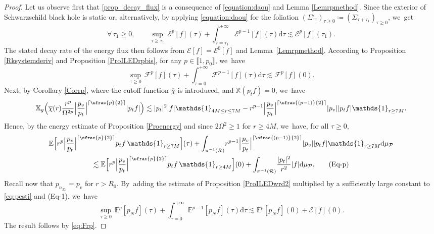 \documentclass[JEP,XML,SOM,Unicode,published]{cedram}
\newcommand{\psfrac}[2]{\sfrac{(#1)}{#2}}
\theoremstyle{plain}
\theoremstyle{definition}
\newcommand\T{{\mathbb{X}}}
\newcommand\dr{{\mathrm{d}}}
\begin{document}
\begin{proof}
Let us observe first that \eqref{prop_decay_flux} is a consequence of \eqref{equation:daou} and Lemma \ref{Lemrpmethod}. Since the exterior of Schwarzschild black hole is static or, alternatively, by applying \eqref{equation:daou} for the foliation $(\Sigma'_\tau)_{\tau \geq 0}\coloneqq(\Sigma_{\tau+\tau_1})_{\tau \geq 0}$, we~get\vspace*{-3pt}
\[
\forall \, \tau_1 \geq 0, \qquad \sup_{\tau \geq \tau_1} \, \mathcal{E}^p[f](\tau) + \int_{\tau=\tau_1}^{+\infty} \mathcal{E}^{p-1}[f](\tau) \dr \tau \lesssim \mathcal{E}^p[f](\tau_1).
\]
The stated decay rate of the energy flux then follows from $\mathcal{E}[f]=\mathcal{E}^0[f]$ and Lem\-ma~\ref{Lemrpmethod}.
According to Proposition \ref{Rksystemderiv} and Proposition \ref{ProILEDrpbis}, for any $p \in \llbracket 1,p_0 \rrbracket$, we~have\vspace*{-3pt}
\begin{equation}\label{eq:Frp}
\sup_{\tau \geq 0}\, \mathcal{F}^p[f](\tau) + \int_{\tau =0}^{+\infty} \mathcal{F}^{p-1}[f](\tau) \dr \tau \lesssim \mathcal{F}^p[f](0).
\end{equation}
Next, by Corollary \ref{Corrp}, where the cutoff function $\overline{\chi}$ is introduced, and $\T(p_t f)=0$, we~have\vspace*{-4pt}
\[
\T_g \Bigl(\overline{\chi}(r) \frac{r^{p}}{\Omega^{2p}} \Big|\frac{p_v}{p_t}\Big|^{\lceil \sfrac{p}{2} \rceil} | p_t f | \Bigr) \lesssim |p_t|^2| f| \mathds{1}_{4M \leq r \leq 7M}- r^{p-1} \Big|\frac{p_v}{p_t}\Big|^{\lceil \psfrac{p-1}{2} \rceil}|p_v||p_t f| \mathds{1}_{r \geq 7M}.
\]
Hence, by the energy estimate of Proposition \ref{Proenergy} and since $2\Omega^2 \geq 1$ for $ r \geq 4M$, we~have, for all $\tau \geq 0$,\vspace*{-4pt}
\begin{multline}
\mathbb{E} \Bigl[ r^{p} \Big|\frac{p_v}{p_t}\Big|^{\lceil \sfrac{p}{2} \rceil} p_t f \, \mathds{1}_{r \geq 7M} \Bigr] (\tau)+\int_{\pi^{-1}(\mathcal{R})} \! r^{p-1} \Big|\frac{p_v}{p_t}\Big|^{\lceil \psfrac{p-1}{2} \rceil}|p_v||p_t f| \mathds{1}_{r \geq 7M} \dr \mu_{\mathcal{P}} \\
\lesssim \mathbb{E} \Bigl[ r^{p} \Big|\frac{p_v}{p_t}\Big|^{\lceil \sfrac{p}{2} \rceil} p_t f \, \mathds{1}_{r \geq 4M} \Bigr] (0)+\int_{\pi^{-1}(\mathcal{R})} \! \frac{ |p_t|^2}{r^2} |f| \dr \mu_{\mathcal{P}}. \label{eq:pesti} \tag{Eq-p}
\end{multline}
Recall now that $p_{n_{\Sigma_\tau}} = p_v$ for $r >R_0$. By~adding the estimate of Proposition \ref{ProILEDwrd2} multiplied by a sufficiently large constant to \eqref{eq:pesti} and (Eq-1), we~have\vspace*{-3pt}
\[
\sup_{\tau \geq 0}\,\mathbb{E}^p [p_N f](\tau) +\int_{\tau =0}^{+\infty} \mathbb{E}^{p-1} [p_N f](\tau) \dr \tau \lesssim \mathbb{E}^p [p_N f](0)+\mathcal{E}[f](0).
\]
The result follows by \eqref{eq:Frp}.
\end{proof}
\end{document}
